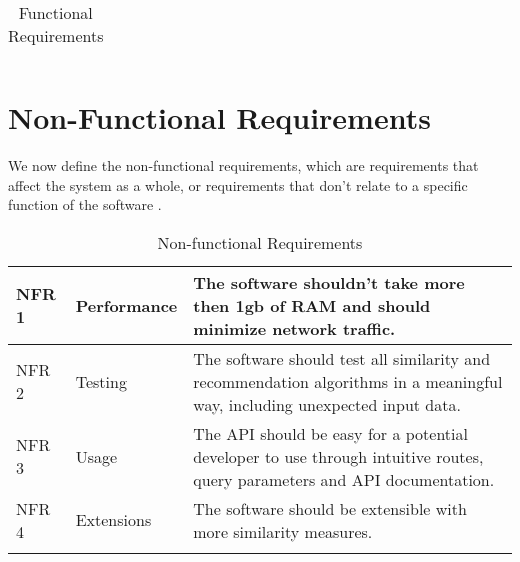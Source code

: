 \begin{longtable}{|p{1.2cm}||p{3.2cm}|p{9cm}|}
  \caption{Functional Requirements}
  \label{tab:fas}
\end{longtable}

\section{Non-Functional Requirements}

We now define the non-functional requirements, which are requirements that affect the system as a whole, or requirements that don't relate to a specific function of the software \cite{sommerville2011software}.

\begin{longtable}{|p{1.2cm}||p{3.2cm}|p{9cm}|}
    \hline
    NFR 1 & Performance & The software shouldn't take more then 1gb of RAM and should minimize network traffic.\\
    \hline
    NFR 2 & Testing & The software should test all similarity and recommendation algorithms in a meaningful way, including unexpected input data.\\
    \hline
    NFR 3 & Usage & The API should be easy for a potential developer to use through intuitive routes, query parameters and API documentation.\\
    \hline
    NFR 4 & Extensions & The software should be extensible with more similarity measures.\\
    \hline
  \caption{Non-functional Requirements}
  \label{tab:fas}
\end{longtable}